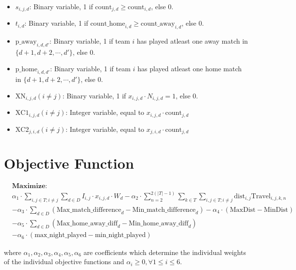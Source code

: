 \documentclass[a4paper, 12pt]{article}
\begin{document}
\begin{itemize}
    \item $s_{i,j,d}$: Binary variable, 1 if $\text{count}_{j,d} \geq \text{count}_{i,d}$, else 0.
    \item $t_{i,d}$: Binary variable, 1 if $\text{count\_home}_{i,d} \geq \text{count\_away}_{i,d}$, else 0.
    \item $\text{p\_away}_{i,d,d'}$: Binary variable, 1 if team $i$ has played atleast one away match in $\{d+1,d+2,\cdots,d'\}$, else 0.
    \item $\text{p\_home}_{i,d,d'}$: Binary variable, 1 if team $i$ has played atleast one home match in $\{d+1,d+2,\cdots,d'\}$, else 0.
    \item $\text{XN}_{i,j,d} (i \neq j)$: Binary variable, 1 if $x_{i,j,d} \cdot N_{i,j,d} = 1$, else 0.
    \item $\text{XC1}_{i,j,d} (i \neq j)$: Integer variable, equal to $x_{i,j,d} \cdot \text{count}_{j,d}$
    \item $\text{XC2}_{j,i,d} (i \neq j)$: Integer variable, equal to $x_{j,i,d} \cdot \text{count}_{j,d}$
\end{itemize}

\section*{Objective Function}
\begin{align*}
&\textbf{Maximize: }\\ 
&\alpha_1 \cdot \sum_{i,j \in T; i \neq j} \sum_{d \in D} I_{i,j} \cdot x_{i,j,d} \cdot W_{d} - \alpha_2 \cdot \sum_{n = 2}^{2(|T| - 1)} \sum_{k \in T} \sum_{i,j \in T; i \neq j}  \text{dist}_{i,j}\text{Travel}_{i,j,k,n}  \\ 
&- \alpha_3 \cdot \sum_{d \in D} (\text{Max\_match\_difference}_{d} - \text{Min\_match\_difference}_{d}) - \alpha_4 \cdot (\text{MaxDist} - \text{MinDist})\\
&- \alpha_5 \cdot \sum_{d \in D} (\text{Max\_home\_away\_diff}_{d} - \text{Min\_home\_away\_diff}_{d}) \\
&- \alpha_6 \cdot (\text{max\_night\_played} - \text{min\_night\_played})
\end{align*}

where $\alpha_1, \alpha_2, \alpha_3, \alpha_4, \alpha_5, \alpha_6$ are coefficients which determine the individual weights of the individual objective functions and $\alpha_i \geq 0, \forall 1 \leq i \leq 6$.

\end{document}
